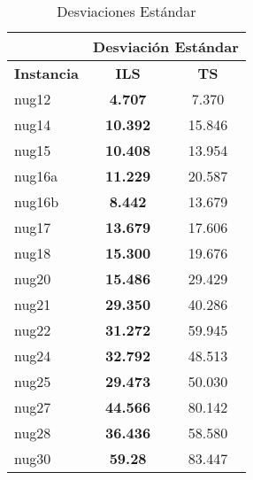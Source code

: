 \documentclass{ci5652}
\begin{document}
\begin{table}[ht]
  \label{table:sd}
    \caption{Desviaciones Estándar}
    \centering
  \begin{tabular}{l|c|c|}
\cline{2-3}
                                      & \multicolumn{2}{c|}{{\bf Desviación Estándar}} \\ \hline
\multicolumn{1}{|l|}{{\bf Instancia}} & {\bf ILS}                & {\bf TS}            \\ \hline
\multicolumn{1}{|l|}{nug12}           & {\bf 4.707}              & 7.370               \\ \hline
\multicolumn{1}{|l|}{nug14}           & {\bf 10.392}             & 15.846              \\ \hline
\multicolumn{1}{|l|}{nug15}           & {\bf 10.408}             & 13.954              \\ \hline
\multicolumn{1}{|l|}{nug16a}          & {\bf 11.229}             & 20.587              \\ \hline
\multicolumn{1}{|l|}{nug16b}          & {\bf 8.442}              & 13.679              \\ \hline
\multicolumn{1}{|l|}{nug17}           & {\bf 13.679}             & 17.606              \\ \hline
\multicolumn{1}{|l|}{nug18}           & {\bf 15.300}             & 19.676              \\ \hline
\multicolumn{1}{|l|}{nug20}           & {\bf 15.486}             & 29.429              \\ \hline
\multicolumn{1}{|l|}{nug21}           & {\bf 29.350}             & 40.286              \\ \hline
\multicolumn{1}{|l|}{nug22}           & {\bf 31.272}             & 59.945              \\ \hline
\multicolumn{1}{|l|}{nug24}           & {\bf 32.792}             & 48.513              \\ \hline
\multicolumn{1}{|l|}{nug25}           & {\bf 29.473}             & 50.030              \\ \hline
\multicolumn{1}{|l|}{nug27}           & {\bf 44.566}             & 80.142              \\ \hline
\multicolumn{1}{|l|}{nug28}           & {\bf 36.436}             & 58.580              \\ \hline
\multicolumn{1}{|l|}{nug30}           & {\bf 59.28}              & 83.447              \\ \hline
\end{tabular}
\end{table}
\end{document}
